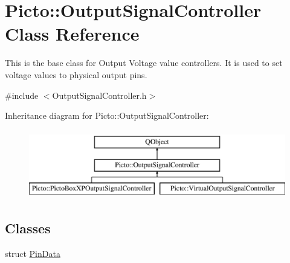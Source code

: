 \hypertarget{class_picto_1_1_output_signal_controller}{\section{Picto\-:\-:Output\-Signal\-Controller Class Reference}
\label{class_picto_1_1_output_signal_controller}
}


This is the base class for Output Voltage value controllers. It is used to set voltage values to physical output pins.  




{\ttfamily \#include $<$Output\-Signal\-Controller.\-h$>$}

Inheritance diagram for Picto\-:\-:Output\-Signal\-Controller\-:\begin{figure}[H]
\begin{center}
\leavevmode
\includegraphics[height=3.000000cm]{class_picto_1_1_output_signal_controller}
\end{center}
\end{figure}
\subsection*{Classes}
\begin{DoxyCompactItemize}
\item 
struct \hyperlink{struct_picto_1_1_output_signal_controller_1_1_pin_data}{Pin\-Data}
\end{DoxyCompactItemize}
